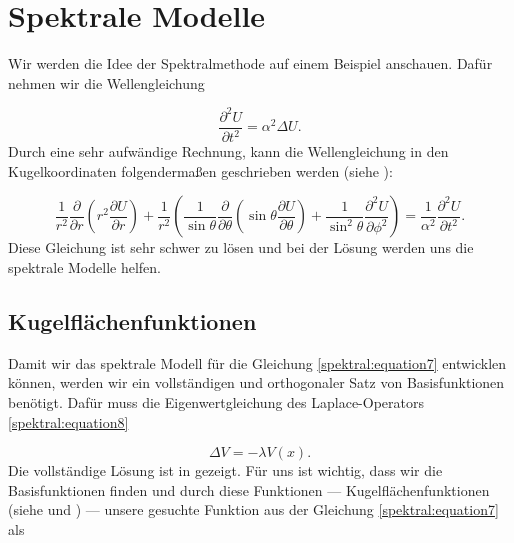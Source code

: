 %
%
%
%
\section{Spektrale Modelle 
\label{spektral:section:spektralemodelle}}

Wir werden die Idee der Spektralmethode auf einem Beispiel anschauen. Dafür nehmen wir die Wellengleichung

\begin{equation}
 \dfrac{\partial^2U}{\partial{t^2}} = \alpha^2\Delta{U}.
\label{spektral:equation7}
\end{equation}
Durch eine sehr aufwändige Rechnung, kann die Wellengleichung in den Kugelkoordinaten folgendermaßen geschrieben werden (siehe \cite[Anhang B]{spektral:QuantenmechanikMathemathischesSeminar}):

\begin{equation}
 \frac{1}{r^2}\frac{\partial}{\partial{r}}\left(r^2\frac{\partial{U}}{\partial{r}}\right) + \frac{1}{r^2}\left(\frac{1}{\sin\theta}\frac{\partial}{\partial{\theta}}\left(\sin\theta\frac{\partial{U}}{\partial{\theta}}\right) + \frac{1}{\sin^2\theta}\frac{\partial^2{U}}{\partial{\phi^2}}\right) = \frac{1}{\alpha^2}\frac{\partial^2{U}}{\partial{t^2}}.
\label{spektral:equation8}
\end{equation}
Diese Gleichung ist sehr schwer zu lösen und bei der Lösung werden uns die spektrale Modelle helfen.

\subsection{Kugelflächenfunktionen
\label{spektral:subsection:kugelflaechenfunktionen}}

Damit wir das spektrale Modell für die Gleichung \eqref{spektral:equation7} entwicklen können, werden wir ein vollständigen und orthogonaler Satz von Basisfunktionen benötigt.
Dafür muss die Eigenwertgleichung des Laplace-Operators \eqref{spektral:equation8}

\begin{equation}
 \Delta{V} = -\lambda{V(x)}.
\label{spektral:equation9}
\end{equation}
Die vollständige Lösung ist in \cite[Seite 62]{spektral:NichtkommutativeBildvearbeitung} gezeigt.
Für uns ist wichtig, dass wir die Basisfunktionen finden und durch diese Funktionen --- Kugelflächenfunktionen (siehe \cite{spektral:MathsemSpezfunk} und \cite{spektral:NichtkommutativeBildvearbeitung}) --- unsere gesuchte Funktion aus der Gleichung \eqref{spektral:equation7} als


